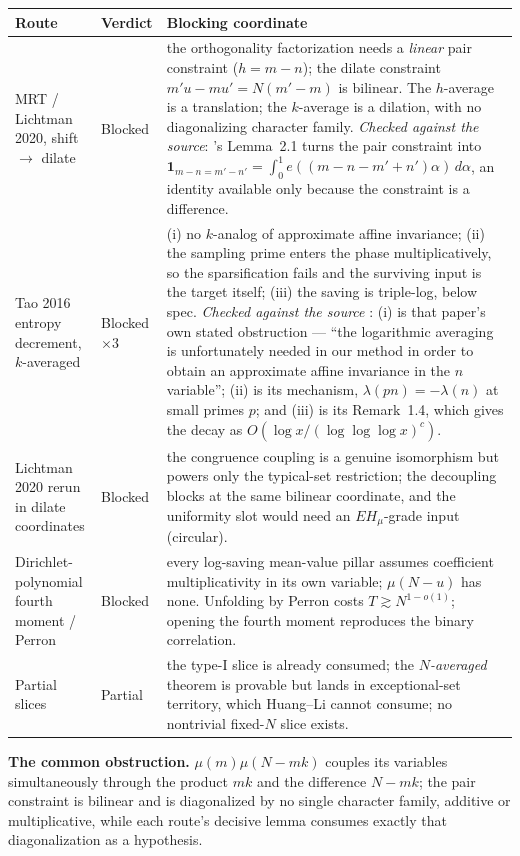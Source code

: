 \documentclass[11pt,a4paper]{article}
\theoremstyle{plain}
\theoremstyle{definition}
\begin{document}
\begin{longtable}{p{}p{}p{}}
\hline
Route & Verdict & Blocking coordinate\\
\hline
\endhead
MRT / Lichtman 2020, shift $\to$ dilate & Blocked &
 the orthogonality factorization needs a \emph{linear} pair
 constraint ($h = m-n$); the dilate constraint
 $m'u - mu' = N(m'-m)$ is bilinear. The $h$-average is a translation;
 the $k$-average is a dilation, with no diagonalizing character
 family. \emph{Checked against the source}: \cite{Li20}'s Lemma~2.1
 turns the pair constraint into
 $\mathbf 1_{m-n=m'-n'}=\int_0^1 e((m-n-m'+n')\alpha)\,d\alpha$, an
 identity available only because the constraint is a difference.\\
Tao 2016 entropy decrement, $k$-averaged & Blocked $\times 3$ &
 (i) no $k$-analog of approximate affine invariance; (ii) the sampling
 prime enters the phase multiplicatively, so the sparsification fails
 and the surviving input is the target itself; (iii) the saving is
 triple-log, below spec. \emph{Checked against the source}
 \cite{Tao}: (i) is that paper's own stated obstruction --- ``the
 logarithmic averaging is unfortunately needed in our method in order
 to obtain an approximate affine invariance in the $n$ variable'';
 (ii) is its mechanism, $\lambda(pn)=-\lambda(n)$ at small primes
 $p$; and (iii) is its Remark~1.4, which gives the decay as
 $O(\log x/(\log\log\log x)^c)$.\\
Lichtman 2020 rerun in dilate coordinates & Blocked &
 the congruence coupling is a genuine isomorphism but powers only the
 typical-set restriction; the decoupling blocks at the same bilinear
 coordinate, and the uniformity slot would need an $EH_\mu$-grade
 input (circular).\\
Dirichlet-polynomial fourth moment / Perron & Blocked &
 every log-saving mean-value pillar assumes coefficient
 multiplicativity in its own variable; $\mu(N-u)$ has none. Unfolding
 by Perron costs $T \gtrsim N^{1-o(1)}$; opening the fourth moment
 reproduces the binary correlation.\\
Partial slices & Partial &
 the type-I slice is already consumed; the \emph{$N$-averaged}
 theorem is provable but lands in exceptional-set territory, which
 Huang--Li cannot consume; no nontrivial fixed-$N$ slice exists.\\
\hline
\end{longtable}

\noindent
\textbf{The common obstruction.} $\mu(m)\mu(N-mk)$ couples its
variables simultaneously through the product $mk$ and the difference
$N-mk$; the pair constraint is bilinear and is diagonalized by no
single character family, additive or multiplicative, while each
route's decisive lemma consumes exactly that diagonalization as a
hypothesis.
\end{document}
